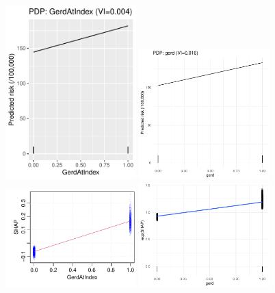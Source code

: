 \documentclass[12pt]{article}
\begin{document}
\begin{figure}[h]
\centering
\includegraphics[width=0.45\textwidth]{figures/pdp/GerdAtIndex.pdf}
\includegraphics[width=0.45\textwidth]{figures/pdp_new/gerd.pdf}
\includegraphics[width=0.45\textwidth]{figures/shap/GerdAtIndex.pdf}
\includegraphics[width=0.45\textwidth]{figures/shap_new/gerd.pdf}
\end{figure}
\end{document}
